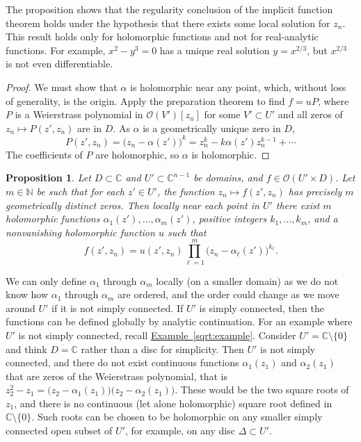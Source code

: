 \documentclass[12pt,openany]{book}
\newcommand{\C}{{\mathbb{C}}}
\newcommand{\N}{{\mathbb{N}}}
\newcommand{\sO}{{\mathscr{O}}}
\theoremstyle{plain}
\newtheorem{prop}[thm]{Proposition}
\theoremstyle{remark}
\theoremstyle{definition}
\theoremstyle{exercise}
\theoremstyle{example}
\newcommand{\exampleref}[1]{\hyperref[#1]{Example~\ref*{#1}}}
\begin{document}
The proposition shows that the regularity conclusion of the implicit
function theorem holds under the hypothesis that there exists some local
solution for $z_n$.  This result holds only for holomorphic
functions and not for real-analytic functions.  For example, $x^2-y^3 = 0$ has a
unique real solution $y = x^{2/3}$, but $x^{2/3}$ is not even
differentiable.

\begin{proof}
We must show that $\alpha$
is holomorphic near any point, which, without loss
of generality, is the origin.
Apply the preparation
theorem to find $f = u P$,
where $P$ is a
Weierstrass polynomial in $\sO(V')[z_n]$ for some $V' \subset U'$
and all zeros of $z_n \mapsto P(z',z_n)$ are in $D$.
As $\alpha$ is a geometrically unique zero in $D$,
\begin{equation*}
P(z',z_n) = {\bigl(z_n-\alpha(z') \bigr)}^k = z_n^k - k \alpha(z') z_n^{k-1}
+ \cdots
\end{equation*}
The coefficients of $P$ are holomorphic, so $\alpha$ is holomorphic.
\end{proof}

\begin{prop} \label{prop:zeroshol}
Let $D \subset \C$ and $U' \subset \C^{n-1}$
be domains,
and
$f \in \sO(U' \times D)$.
Let $m \in \N$ be such that
for each $z' \in U'$, the function $z_n \mapsto f(z',z_n)$ has
precisely $m$ geometrically distinct zeros.
Then locally near each point in $U'$ there exist $m$ holomorphic functions
$\alpha_1(z'),\ldots,\alpha_m(z')$,
positive integers
$k_1,\ldots,k_m$,
and a nonvanishing holomorphic function $u$
such that
\begin{equation*}
f(z',z_n) = u(z',z_n) \prod_{\ell=1}^m {\bigl( z_n - \alpha_\ell(z')
\bigr)}^{k_\ell}
.
\end{equation*}
\end{prop}

We can only define $\alpha_1$ through $\alpha_m$ locally (on a
smaller domain) as we do not know
how $\alpha_1$ through $\alpha_m$ are ordered, and the order could change
as we move around
$U'$ if it is not simply connected.  If $U'$ is simply connected, then
the functions can be defined globally by analytic continuation.
For an example where $U'$ is not simply connected,
recall \exampleref{sqrt:example}. Consider $U' = \C \setminus \{ 0 \}$ and
think $D=\C$ rather than a disc for simplicity.  Then $U'$ is not simply
connected, and there do not exist continuous functions
$\alpha_1(z_1)$ and
$\alpha_2(z_1)$ that are zeros
of the Weierstrass polynomial, that is
$z_2^2 - z_1 =
\bigl(z_2-\alpha_1(z_1) \bigr)
\bigl(z_2-\alpha_2(z_1) \bigr)$.
These would be the two square roots of $z_1$, and there is no continuous
(let alone holomorphic) square root defined in $\C \setminus \{ 0 \}$.
Such roots can be chosen to be holomorphic on any smaller
simply connected open subset of $U'$, for
example, on any disc $\Delta \subset U'$.
\end{document}
